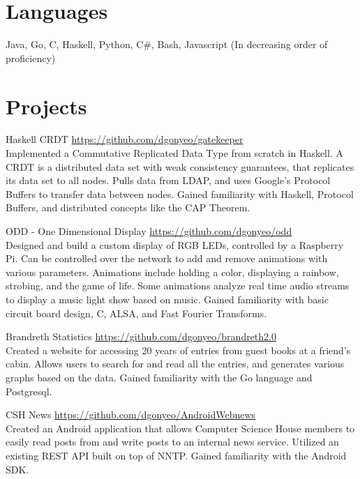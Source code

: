 \documentclass[letterpaper,margin,line,11pt]{resume}
\newcommand{\rurl}[1]{\hfill {\footnotesize \url{#1}}}
\begin{document}
\begin{resume}
\section{\mysidestyle Languages}
    Java, Go, C, Haskell, Python, C\#, Bash, Javascript 
    \hfill 
    \footnotesize 
    (In decreasing order of proficiency)
    \normalsize

\section{\mysidestyle Projects}
    \begin{compactdesc}
        \item[Haskell CRDT] \rurl{https://github.com/dgonyeo/gatekeeper} \\
            Implemented a Commutative Replicated Data Type from scratch in Haskell. A CRDT is a distributed data set with weak consistency guarantees, that replicates its data set to all nodes. Pulls data from LDAP, and uses Google's Protocol Buffers to transfer data between nodes. Gained familiarity with Haskell, Protocol Buffers, and distributed concepts like the CAP Theorem.
        \item[ODD - One Dimensional Display] \rurl{https://github.com/dgonyeo/odd} \\
            Designed and build a custom display of RGB LEDs, controlled by a Raspberry Pi. Can be controlled over the network to add and remove animations with various parameters. Animations include holding a color, displaying a rainbow, strobing, and the game of life. Some animations analyze real time audio streams to display a music light show based on music. Gained familiarity with basic circuit board design, C, ALSA, and Fast Fourier Transforms.
        \item[Brandreth Statistics] \rurl{https://github.com/dgonyeo/brandreth2.0} \\
            Created a website for accessing 20 years of entries from guest books at a friend's cabin. Allows users to search for and read all the entries, and generates various graphs based on the data. Gained familiarity with the Go language and Postgresql.
        \item[CSH News] \rurl{https://github.com/dgonyeo/AndroidWebnews} \\
            Created an Android application that allows Computer Science House members to easily read posts from and write posts to an internal news service. Utilized an existing REST API built on top of NNTP. Gained familiarity with the Android SDK.
    \end{compactdesc}


\end{resume}
\end{document}
